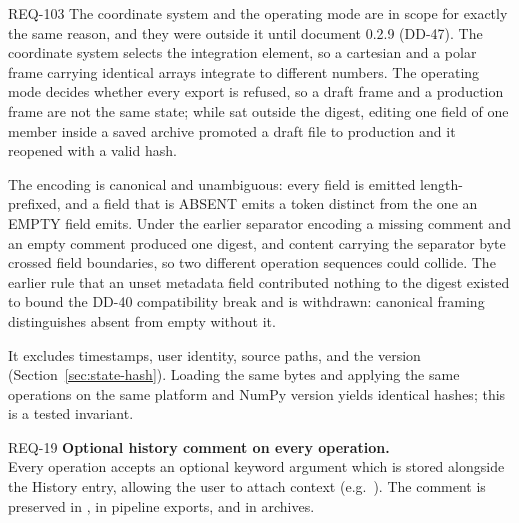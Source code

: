 \begin{reqbox}{REQ-103}{\stable}
The coordinate system and the operating mode are in scope for exactly
the same reason, and they were outside it until document 0.2.9
(DD-47). The coordinate system selects the integration element, so a
cartesian and a polar frame carrying identical arrays integrate to
different numbers. The operating mode decides whether every export is
refused, so a draft frame and a production frame are not the same
state; while  sat outside the digest, editing one field of
one member inside a saved archive promoted a draft file to production
and it reopened with a valid hash.

The encoding is canonical and unambiguous: every field is emitted
length-prefixed, and a field that is ABSENT emits a token distinct from
the one an EMPTY field emits. Under the earlier separator encoding a
missing comment and an empty comment produced one digest, and content
carrying the separator byte crossed field boundaries, so two different
operation sequences could collide. The earlier rule that an unset
metadata field contributed nothing to the digest existed to bound the
DD-40 compatibility break and is withdrawn: canonical framing
distinguishes absent from empty without it.

It excludes timestamps, user identity, source paths, and the \itc{}
version (Section~\ref{sec:state-hash}). Loading the same bytes and
applying the same operations on the same platform and NumPy version
yields identical hashes; this is a tested invariant.
\end{reqbox}

\begin{reqbox}{REQ-19}{\stable}
\textbf{Optional history comment on every operation.}\\
Every operation accepts an optional keyword argument 
which is stored alongside the History entry, allowing the user to attach
context (e.g.\ ).
The comment is preserved in , in pipeline exports, and
in  archives.
\end{reqbox}

